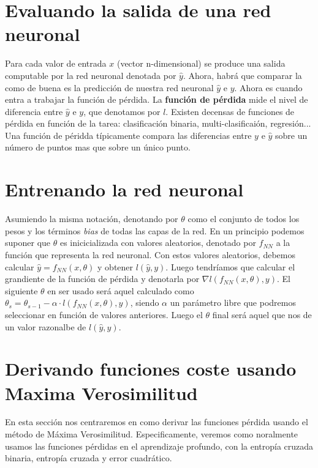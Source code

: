 \section{Evaluando la salida de una red neuronal}

Para cada valor de entrada $x$ (vector n-dimensional) se produce una salida computable por la red neuronal denotada por $\hat{y}$. Ahora, habrá que comparar la como de buena es la predicción de nuestra red neuronal $\hat{y}$ e $y$. Ahora es cuando entra a trabajar la función de pérdida. La \textbf{función de pérdida} mide el nivel de diferencia entre $\hat{y}$ e $y$, que denotamos por $l$. Existen decensas de funciones de pérdida en función de la tarea: clasificación binaria, multi-clasificaión, regresión... Una función de péridda típicamente compara las diferencias entre $y$ e $\hat{y}$ sobre un número de puntos mas que sobre un único punto. 

\section{Entrenando la red neuronal}

Asumiendo la misma notación, denotando por $\theta$ como el conjunto de todos los pesos y los términos \textit{bias} de todas las capas de la red. En un principio podemos suponer que $\theta$ es inicicializada con valores aleatorios, denotado por $f_{NN}$ a la función que representa la red neuronal. Con estos valores aleatorios, debemos calcular $\hat{y} = f_{NN} (x,\theta)$ y obtener $l(\hat{y},y)$. Luego tendríamos que calcular el grandiente de la función de pérdida y denotarla por $\nabla l (f_{NN}(x,\theta),y)$. El siguiente $\theta$ en ser usado será aquel calculado como $\theta_s=\theta_{s-1} - \alpha \cdot l (f_{NN}(x,\theta),y)$, siendo $\alpha$ un parámetro libre que podremos seleccionar en función de valores anteriores. Luego el $\theta$ final será aquel que nos de un valor razonalbe de $l(\hat{y},y)$. 

\section{Derivando funciones coste usando Maxima Verosimilitud}

En esta sección nos centraremos en como derivar las funciones pérdida usando el método de Máxima Verosimilitud. Especificamente, veremos como noralmente usamos las funciones pérdidas en el aprendizaje profundo, con la entropía cruzada binaria, entropía cruzada y error cuadrático. 

